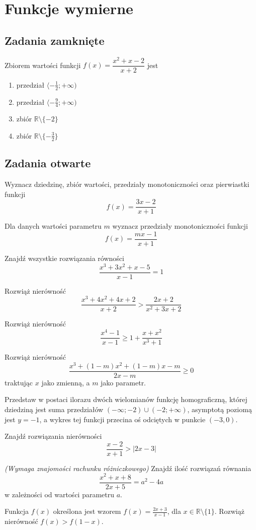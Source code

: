 \setcounter{parc}{0}
\addtocounter{chapc}{1}

\chapter{Funkcje wymierne}

\section{Zadania zamknięte}

\zadanie Zbiorem wartości funkcji $f(x) = \dfrac{x^2 + x - 2}{x + 2}$ jest
\begin{enumerate}[label=\alph*)]
	\item przedział $ \langle -\frac{1}{2}; +\infty ) $
	\item przedział $ \langle -\frac{9}{4}; +\infty ) $
	\item zbiór $\mathbb{R} \setminus \{-2\}$ %
	\item zbiór $\mathbb{R} \setminus \{-\frac{3}{2}\}$
\end{enumerate}

\section{Zadania otwarte}

\zadanie Wyznacz dziedzinę, zbiór wartości, przedziały monotoniczności oraz pierwiastki funkcji \[ f(x) = \dfrac{3x - 2}{x + 1} \]

\zadanie Dla danych wartości parametru $m$ wyznacz przedziały monotoniczności funkcji \[ f(x) = \dfrac{mx - 1}{x + 1} \]

\zadanie Znajdź wszystkie rozwiązania równości \[ \dfrac{x^3 + 3x^2 + x - 5}{x - 1} = 1 \] %

\zadanie Rozwiąż nierówność \[ \dfrac{x^3 + 4x^2 + 4x + 2}{x + 2} > \dfrac{2x + 2}{x^2 + 3x + 2}\] %

\zadanie Rozwiąż nierówność \[ \dfrac{x^4 - 1}{x - 1} \geqslant 1 + \dfrac{x + x^2}{x^3 + 1} \] %

\zadanie Rozwiąż nierówność \[  \dfrac{x^3 + (1 - m)x^2 + (1 - m)x - m}{2x - m} \geqslant 0 \] traktując $x$ jako zmienną, a $m$ jako parametr.

\zadanie Przedstaw w postaci ilorazu dwóch wielomianów funkcję homograficzną, której dziedziną jest suma przedziałów $(-\infty; -2) \cup (-2; +\infty)$, asymptotą poziomą jest $y = -1$, a wykres tej funkcji przecina oś odciętych w punkcie $(-3, 0)$.

\zadanie Znajdź rozwiązania nierówności \[ \dfrac{x - 2}{x + 1} > |2x - 3| \]

\zadanie \textit{(Wymaga znajomości rachunku różniczkowego)} Znajdź ilość rozwiązań równania \[ \dfrac{x^2 + x + 8}{2x + 5} = a^2 - 4a \] w zależności od wartości parametru $a$.

\zadanie Funkcja $f(x)$ określona jest wzorem $f(x) = \frac{2x + 3}{x - 1}$, dla ${x \in \mathbb{R} \setminus \{1\}}$. Rozwiąż nierówność $f(x) > f(1 - x)$.